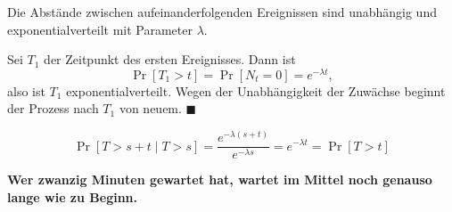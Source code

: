 \begin{merksatz}
Die Abstände zwischen aufeinanderfolgenden Ereignissen sind unabhängig und exponentialverteilt mit Parameter $\lambda$.

Sei $T_1$ der Zeitpunkt des ersten Ereignisses. Dann ist
\[ \Pr[T_1 > t] = \Pr[N_t = 0] = e^{-\lambda t} , \]
also ist $T_1$ exponentialverteilt. Wegen der Unabhängigkeit der Zuwächse beginnt der Prozess nach $T_1$ von neuem. $\blacksquare$

\[ \Pr[T > s+t \mid T > s] = \frac{e^{-\lambda(s+t)}}{e^{-\lambda s}} = e^{-\lambda t} = \Pr[T > t] \]

\begin{center}
\begin{minipage}{0.9\textwidth}
\textbf{Wer zwanzig Minuten gewartet hat, wartet im Mittel noch genauso lange wie zu Beginn.}
\end{minipage}
\end{center}

\begin{center}
\begin{minipage}{0.88\textwidth}
\end{minipage}
\end{center}
\end{merksatz}

